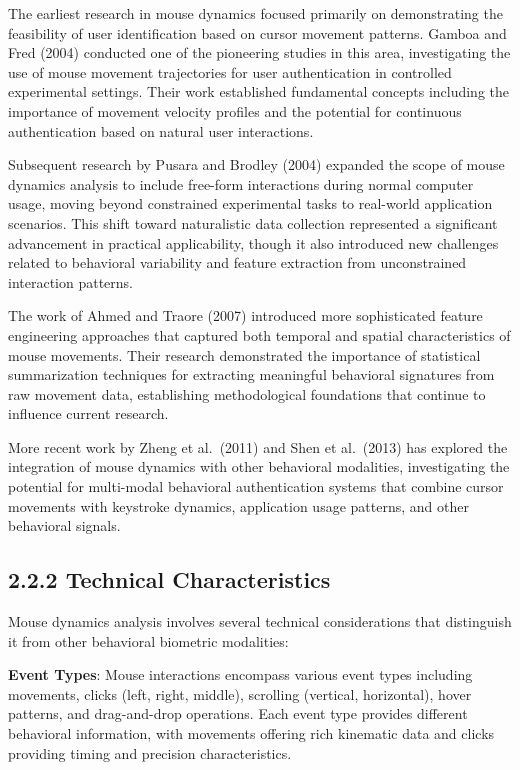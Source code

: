 \documentclass[
  12pt,
  a4paper,
]{report}
\begin{document}
The earliest research in mouse dynamics focused primarily on
demonstrating the feasibility of user identification based on cursor
movement patterns. Gamboa and Fred (2004) conducted one of the
pioneering studies in this area, investigating the use of mouse movement
trajectories for user authentication in controlled experimental
settings. Their work established fundamental concepts including the
importance of movement velocity profiles and the potential for
continuous authentication based on natural user interactions.

Subsequent research by Pusara and Brodley (2004) expanded the scope of
mouse dynamics analysis to include free-form interactions during normal
computer usage, moving beyond constrained experimental tasks to
real-world application scenarios. This shift toward naturalistic data
collection represented a significant advancement in practical
applicability, though it also introduced new challenges related to
behavioral variability and feature extraction from unconstrained
interaction patterns.

The work of Ahmed and Traore (2007) introduced more sophisticated
feature engineering approaches that captured both temporal and spatial
characteristics of mouse movements. Their research demonstrated the
importance of statistical summarization techniques for extracting
meaningful behavioral signatures from raw movement data, establishing
methodological foundations that continue to influence current research.

More recent work by Zheng et al.~(2011) and Shen et al.~(2013) has
explored the integration of mouse dynamics with other behavioral
modalities, investigating the potential for multi-modal behavioral
authentication systems that combine cursor movements with keystroke
dynamics, application usage patterns, and other behavioral signals.

\subsection{2.2.2 Technical
Characteristics}\label{technical-characteristics}

Mouse dynamics analysis involves several technical considerations that
distinguish it from other behavioral biometric modalities:

\textbf{Event Types}: Mouse interactions encompass various event types
including movements, clicks (left, right, middle), scrolling (vertical,
horizontal), hover patterns, and drag-and-drop operations. Each event
type provides different behavioral information, with movements offering
rich kinematic data and clicks providing timing and precision
characteristics.
\end{document}
